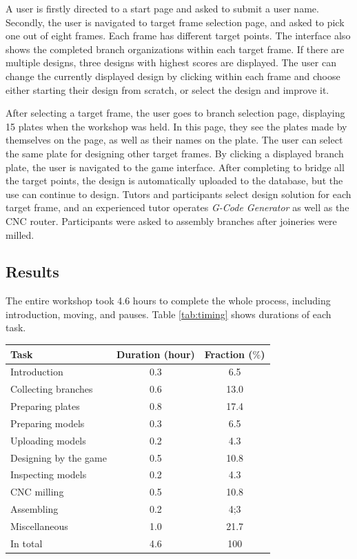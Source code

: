 A user is firstly directed to a start page and asked to submit a user name.
Secondly, the user is navigated to target frame selection page, and asked to pick one out of eight frames.
Each frame has different target points.
The interface also shows the completed branch organizations within each target frame.
If there are multiple designs, three designs with highest scores are displayed.
The user can change the currently displayed design by clicking within each frame and choose either starting their design from scratch, or select the design and improve it.

After selecting a target frame, the user goes to branch selection page, displaying 15 plates when the workshop was held.
In this page, they see the plates made by themselves on the page, as well as their names on the plate.
The user can select the same plate for designing other target frames.
By clicking a displayed branch plate, the user is navigated to the game interface.
After completing to bridge all the target points, the design is automatically uploaded to the database, but the use can continue to design.
Tutors and participants select design solution for each target frame, and an experienced tutor operates \textit{G-Code Generator} as well as the CNC router.
Participants were asked to assembly branches after joineries were milled.

\subsection{Results}
The entire workshop took 4.6 hours to complete the whole process, including introduction, moving, and pauses.
Table \ref{tab:timing} shows durations of each task.

\begin{center}
  \begin{tabulary}{\columnwidth}{ |l||C|C| }
    \hline
    Task & Duration (hour) & Fraction ($\%$) \\
    \hline
    Introduction                  & 0.3 & 6.5  \\
    Collecting branches           & 0.6 & 13.0  \\
    Preparing plates              & 0.8 & 17.4  \\
    Preparing models              & 0.3 & 6.5  \\
    Uploading models              & 0.2 & 4.3 \\
    Designing by the game         & 0.5 & 10.8 \\
    Inspecting models             & 0.2 & 4.3 \\
    CNC milling                   & 0.5 & 10.8\\
    Assembling                    & 0.2 & 4;3 \\
    Miscellaneous                 & 1.0 & 21.7 \\
    \hline
    In total                      & 4.6   & 100 \\
    \hline
  \end{tabulary}
  \label{tab:timing}
\end{center}

